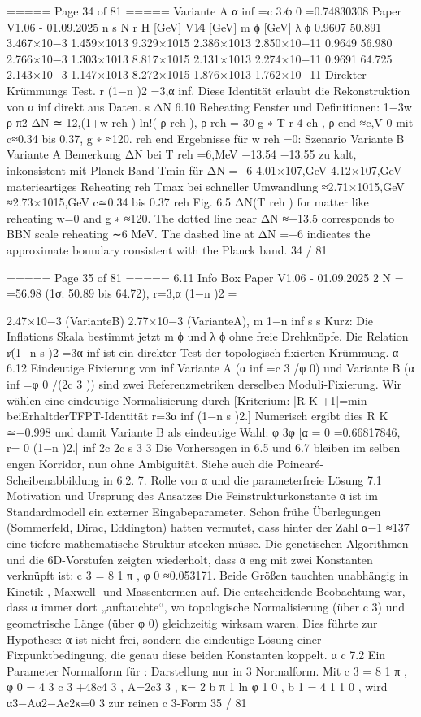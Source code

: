 \begin{MyVerbatim}
===== Page 34 of 81 =====
Variante A α inf =c 3 ∕φ 0 =0.74830308
Paper V1.06 - 01.09.2025
n s N r H [GeV] V1∕4 [GeV] m ϕ [GeV] λ ϕ
0.9607 50.891 3.467×10−3 1.459×1013 9.329×1015 2.386×1013 2.850×10−11
0.9649 56.980 2.766×10−3 1.303×1013 8.817×1015 2.131×1013 2.274×10−11
0.9691 64.725 2.143×10−3 1.147×1013 8.272×1015 1.876×1013 1.762×10−11
Direkter Krümmungs Test.
r
(1−n )2 =3,α inf. Diese Identität erlaubt die Rekonstruktion von α inf direkt aus Daten.
s
ΔN
6.10 Reheating Fenster und
Definitionen:
1−3w ρ π2
ΔN ≃ 12,(1+w reh ) ln!( ρ reh ), ρ reh = 30 g ∗ T r 4 eh , ρ end ≈c,V 0 mit c≈0.34 bis 0.37, g ∗ ≈120.
reh end
Ergebnisse für w reh =0:
Szenario Variante B Variante A Bemerkung
ΔN bei T reh =6,MeV −13.54 −13.55 zu kalt, inkonsistent mit Planck Band
Tmin für ΔN =−6 4.01×107,GeV 4.12×107,GeV materieartiges Reheating
reh
Tmax bei schneller Umwandlung ≈2.71×1015,GeV ≈2.73×1015,GeV c≃0.34 bis 0.37
reh
Fig. 6.5 ΔN(T reh ) for matter like reheating w=0 and g ∗ ≈120. The dotted line near ΔN ≈−13.5 corresponds to BBN
scale reheating ∼6 MeV. The dashed line at ΔN =−6 indicates the approximate boundary consistent with the
Planck band. 34 / 81

===== Page 35 of 81 =====
6.11 Info Box
Paper V1.06 - 01.09.2025
2
N = =56.98 (1σ: 50.89 bis 64.72), r=3,α (1−n )2 ={2.47×10−3 (VarianteB) 2.77×10−3 (VarianteA), m
1−n inf s
s
Kurz: Die Inflations Skala bestimmt jetzt m ϕ und λ ϕ ohne freie Drehknöpfe. Die Relation r∕(1−n s )2 =3α inf ist ein
direkter Test der topologisch fixierten Krümmung.
α
6.12 Eindeutige Fixierung von
inf
Variante A (α inf =c 3 /φ 0) und Variante B (α inf =φ 0 /(2c 3 )) sind zwei Referenzmetriken derselben Moduli-Fixierung. Wir
wählen eine eindeutige Normalisierung durch
[Kriterium: |R
K
+1|=min beiErhaltderTFPT-Identität r=3α
inf
(1−n
s
)2.]
Numerisch ergibt dies R K ≃−0.998 und damit Variante B als eindeutige Wahl:
φ 3φ
[α = 0 =0.66817846, r= 0 (1−n )2.]
inf 2c 2c s
3 3
Die Vorhersagen in 6.5 und 6.7 bleiben im selben engen Korridor, nun ohne Ambiguität. Siehe auch die
Poincaré-Scheibenabbildung in 6.2.
7. Rolle von α und die parameterfreie Lösung
7.1 Motivation und Ursprung des Ansatzes
Die Feinstrukturkonstante α ist im Standardmodell ein externer Eingabeparameter. Schon frühe Überlegungen
(Sommerfeld, Dirac, Eddington) hatten vermutet, dass hinter der Zahl α−1 ≈137 eine tiefere mathematische Struktur
stecken müsse.
Die genetischen Algorithmen und die 6D-Vorstufen zeigten wiederholt, dass α eng mit zwei Konstanten verknüpft ist:
c 3 = 8 1 π , φ 0 ≈0.053171.
Beide Größen tauchten unabhängig in Kinetik-, Maxwell- und Massentermen auf. Die entscheidende Beobachtung war,
dass α immer dort „auftauchte“, wo topologische Normalisierung (über c 3) und geometrische Länge (über φ 0)
gleichzeitig wirksam waren.
Dies führte zur Hypothese: α ist nicht frei, sondern die eindeutige Lösung einer Fixpunktbedingung, die genau
diese beiden Konstanten koppelt.
α c
7.2 Ein Parameter Normalform für : Darstellung nur in
3
Normalform. Mit c 3 = 8 1 π ,
φ 0 = 4 3 c 3 +48c4 3 , A=2c3 3 , κ= 2 b π 1 ln φ 1 0 , b 1 = 4 1 1 0 ,
wird
α3−Aα2−Ac2κ=0
3
zur reinen c 3-Form
35 / 81

}
\end{MyVerbatim}
